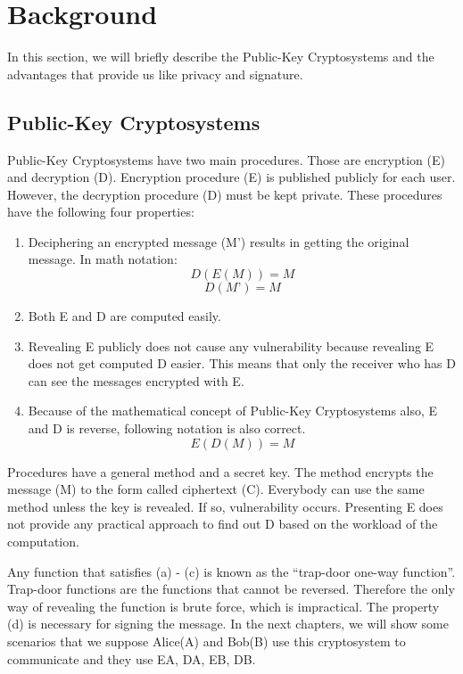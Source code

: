 \documentclass[12pt, letterpaper]{article}
\begin{document}
\section{Background}

In this section, we will briefly describe the Public-Key Cryptosystems and the advantages that provide us like privacy and signature.

\subsection{Public-Key Cryptosystems}

Public-Key Cryptosystems have two main procedures. Those are encryption (E) and decryption (D). Encryption procedure (E) is published publicly for each user. However, the decryption procedure (D) must be kept private. These procedures have the following four properties:\\

\renewcommand{\theenumi}{\alph{enumi}}
\begin{enumerate}
\item   
Deciphering an encrypted message (M’) results in getting the original message. In math notation:
\begin{equation}
D(E(M)) = M
\end{equation}
\[ D(M’) = M \]   
    
\item
Both E and D are computed easily.

\item
Revealing E publicly does not cause any vulnerability because revealing E does not get computed D easier. This means that only the receiver who has D can see the messages encrypted with E.

\item
Because of the mathematical concept of Public-Key Cryptosystems also, E and D is reverse, following notation is also correct.
\begin{equation}
E(D(M)) = M
\end{equation}
\end{enumerate}

Procedures have a general method and a secret key. The method encrypts the message (M) to the form called ciphertext (C). Everybody can use the same method unless the key is revealed. If so, vulnerability occurs. Presenting E does not provide any practical approach to find out D based on the workload of the computation.
\par
Any function that satisfies (a) - (c) is known as the “trap-door one-way function”. Trap-door functions are the functions that cannot be reversed. Therefore the only way of revealing the function is brute force, which is impractical. The property (d) is necessary for signing the message. In the next chapters, we will show some scenarios that we suppose Alice(A) and Bob(B) use this cryptosystem to communicate and they use EA, DA, EB, DB.
\end{document}
